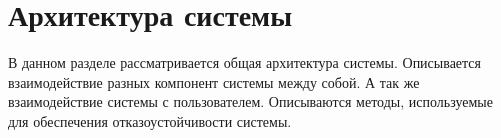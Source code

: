 \section{Архитектура системы}

\begin{annotation}
	В данном разделе рассматривается общая архитектура системы.
	Описывается взаимодействие разных компонент системы между собой.
	А так же взаимодействие системы с пользователем.
	Описываются методы, используемые для обеспечения отказоустойчивости системы.
\end{annotation}







